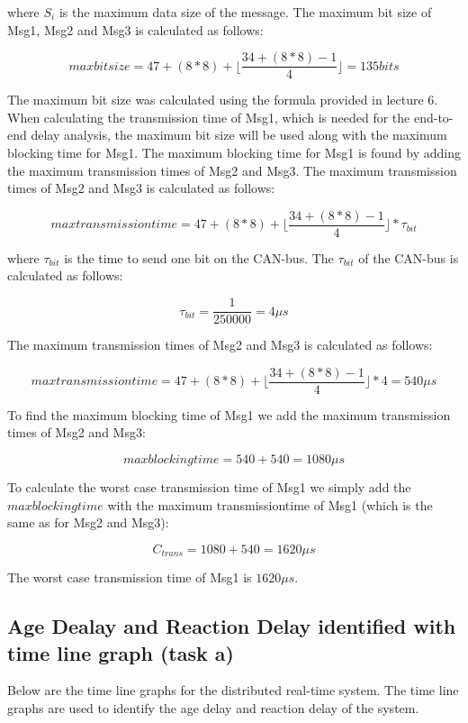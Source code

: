         where $S_i$ is the maximum data size of the message. The maximum bit size of Msg1, Msg2 and Msg3 is calculated as follows:

        $$maxbitsize = 47+(8*8)+\lfloor\frac{34+(8*8)-1}{4}\rfloor = 135 bits$$

        The maximum bit size was calculated using the formula provided in lecture 6. When calculating the transmission time of Msg1, which is needed for the end-to-end delay analysis, the maximum bit size will be used along with the maximum blocking time for Msg1. The maximum blocking time for Msg1 is found by adding the maximum transmission times of Msg2 and Msg3. The maximum transmission times of Msg2 and Msg3 is calculated as follows:

        $$maxtransmissiontime = 47+(8*8)+\lfloor\frac{34+(8*8)-1}{4}\rfloor*\tau_{bit}$$

        where $\tau_{bit}$ is the time to send one bit on the CAN-bus. The $\tau_{bit}$ of the CAN-bus is calculated as follows:

        $$\tau_{bit} = \frac{1}{250000} = 4\mu s$$

        The maximum transmission times of Msg2 and Msg3 is calculated as follows:

        $$maxtransmissiontime = 47+(8*8)+\lfloor\frac{34+(8*8)-1}{4}\rfloor*4 = 540\mu s$$

        To find the maximum blocking time of Msg1 we add the maximum transmission times of Msg2 and Msg3:

        $$maxblockingtime = 540+540 = 1080\mu s$$

        To calculate the worst case transmission time of Msg1 we simply add the $maxblockingtime$ with the maximum transmissiontime of Msg1 (which is the same as for Msg2 and Msg3):

        $$C_{trans} = 1080+540 = 1620\mu s$$

        The worst case transmission time of Msg1 is $1620\mu s$.

    \subsection*{\textbf{Age Dealay and Reaction Delay identified with time line graph (task a)}}
        Below are the time line graphs for the distributed real-time system. The time line graphs are used to identify the age delay and reaction delay of the system. 

